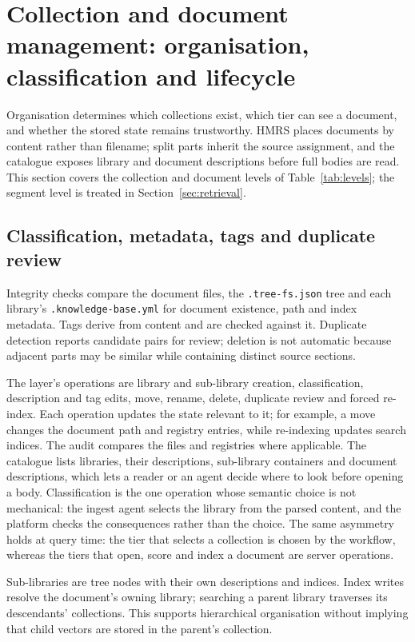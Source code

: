 \section{Collection and document management: organisation, classification and
lifecycle}
\label{sec:organization}

Organisation determines which collections exist, which tier can see a
document, and whether the stored state remains trustworthy. HMRS places
documents by content rather than filename; split parts inherit the source
assignment, and the catalogue exposes library and document descriptions
before full bodies are read. This section covers the collection and document
levels of Table~\ref{tab:levels}; the segment level is treated in
Section~\ref{sec:retrieval}.

\subsection{Classification, metadata, tags and duplicate review}
\label{sec:org-placement}
\label{sec:org-registries}
\label{sec:org-tags}
\label{sec:org-dedup}

Integrity checks compare the document files, the \texttt{.tree-fs.json} tree
and each library's \texttt{.knowledge-base.yml} for document existence, path
and index metadata. Tags derive from content and are checked against it.
Duplicate detection reports candidate pairs for review; deletion is not
automatic because adjacent parts may be similar while containing distinct
source sections.

The layer's operations are library and sub-library creation, classification,
description and tag edits, move, rename, delete, duplicate review and forced
re-index. Each operation updates the state relevant to it; for example, a move changes
the document path and registry entries, while re-indexing updates search
indices. The audit compares the files and registries where applicable. The catalogue lists libraries, their
descriptions, sub-library containers and document descriptions, which lets a
reader or an agent decide where to look before opening a body. Classification
is the one operation whose semantic choice is not mechanical: the ingest agent
selects the library from the parsed content, and the platform checks the
consequences rather than the choice. The same asymmetry holds at query time:
the tier that selects a collection is chosen by the workflow, whereas the
tiers that open, score and index a document are server operations.

Sub-libraries are tree nodes with their own descriptions and indices. Index writes resolve the document's owning library; searching a parent
library traverses its descendants' collections. This supports hierarchical
organisation without implying that child vectors are stored in the parent's
collection.

